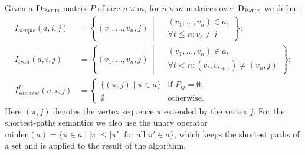 Given a $\textsc{D}_{\textsc{Paths}}$ matrix $P$ of size $n \times m$,
for $n \times m$ matrices over $\textsc{D}_{\textsc{Paths}}$ we define:
\begin{align*}
  I_{simple}(a, i, j) &= \left\{
      (v_1, \ldots, v_n, j) \,\middle|\,
      \begin{aligned}
        & (v_1, \ldots, v_n) \in a, \\
        & \forall t \leq n: v_t \neq j
      \end{aligned}
    \right\}; \\
  I_{trail}(a, i, j) &= \left\{
      (v_1, \ldots, v_n, j) \,\middle|\,
      \begin{aligned}
        & (v_1, \ldots, v_n) \in a, \\
        & \forall t < n: (v_t, v_{t+1}) \neq (v_n, j)
      \end{aligned}
    \right\}; \\
  I^P_{shortest}(a, i, j) &= \begin{cases}
      \{ (\pi, j) \mid \pi \in a \} & \text{if } P_{ij} = \emptyset, \\
      \emptyset & \text{otherwise}.
    \end{cases}
\end{align*}
Here $(\pi, j)$ denotes the vertex sequence $\pi$ extended by the vertex $j$.
For the shortest-paths semantics we also use the unary operator
$\mathrm{minlen}(a) = \{ \pi \in a \mid |\pi| \leq |\pi'| \text{ for all } \pi' \in a \}$,
which keeps the shortest paths of a set and is applied to the result of the algorithm.

